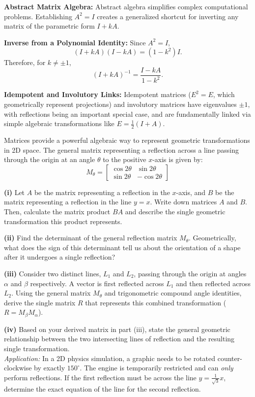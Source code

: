 \begin{takeaways}
\item \textbf{Abstract Matrix Algebra:} Abstract algebra simplifies complex computational problems. Establishing $A^2=I$ creates a generalized shortcut for inverting any matrix of the parametric form $I+kA$.
\item \textbf{Inverse from a Polynomial Identity:} Since $A^2=I$,
\[
(I+kA)(I-kA)=(1-k^2)I.
\]
Therefore, for $k\neq\pm1$,
\[
(I+kA)^{-1}=\frac{I-kA}{1-k^2}.
\]
\item \textbf{Idempotent and Involutory Links:} Idempotent matrices ($E^2=E$, which geometrically represent projections) and involutory matrices have eigenvalues $\pm1$, with reflections being an important special case, and are fundamentally linked via simple algebraic transformations like $E = \frac{1}{2}(I + A)$.
\end{takeaways}

\begin{problem}
Matrices provide a powerful algebraic way to represent geometric transformations in 2D space. The general matrix representing a reflection across a line passing through the origin at an angle $\theta$ to the positive $x$-axis is given by:
\[M_\theta = \begin{bmatrix} \cos 2\theta & \sin 2\theta \\ \sin 2\theta & -\cos 2\theta \end{bmatrix}\]

\textbf{(i)} Let $A$ be the matrix representing a reflection in the $x$-axis, and $B$ be the matrix representing a reflection in the line $y = x$. Write down matrices $A$ and $B$. Then, calculate the matrix product $BA$ and describe the single geometric transformation this product represents.

\textbf{(ii)} Find the determinant of the general reflection matrix $M_\theta$. Geometrically, what does the sign of this determinant tell us about the orientation of a shape after it undergoes a single reflection?

\textbf{(iii)} Consider two distinct lines, $L_1$ and $L_2$, passing through the origin at angles $\alpha$ and $\beta$ respectively. A vector is first reflected across $L_1$ and then reflected across $L_2$. Using the general matrix $M_\theta$ and trigonometric compound angle identities, derive the single matrix $R$ that represents this combined transformation ($R = M_\beta M_\alpha$). 

\textbf{(iv)} Based on your derived matrix in part (iii), state the general geometric relationship between the two intersecting lines of reflection and the resulting single transformation. \\
\textit{Application:} In a 2D physics simulation, a graphic needs to be rotated counter-clockwise by exactly $150^\circ$. The engine is temporarily restricted and can \textit{only} perform reflections. If the first reflection must be across the line $y = \frac{1}{\sqrt{3}}x$, determine the exact equation of the line for the second reflection.
\end{problem}

